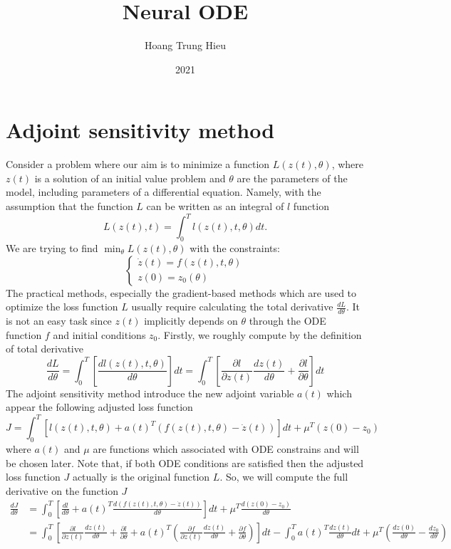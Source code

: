 \documentclass{article}
\theoremstyle{theorem}
\theoremstyle{definition}
\begin{document}
	
	
	\title{Neural ODE}
	
	\author{Hoang Trung Hieu
	}                      
	\date{2021}
	
	\noindent  
	\section{Adjoint sensitivity method}
	Consider a problem where our aim is to minimize a function $L(z(t), \theta)$, where $z(t)$ is a solution of an initial value problem and $\theta$ are the parameters of the model, including parameters of a differential equation. Namely, with the assumption that the function $L$ can be written as an integral of $l$ function $$L(z(t),t)= \int _{0}^{T} l(z(t),t,\theta)dt.$$ We are trying to find $\min_{\theta} L(z(t),\theta)$ with the constraints: $$\left\{\begin{matrix}
	\dot{z}(t)=f(z(t),t, \theta)	\\ 
	z(0)=z_0(\theta)
	\end{matrix}\right.$$
The practical methods, especially the gradient-based methods which are used to optimize the loss function $L$ usually require calculating the total derivative $\frac{dL}{d\theta}$. It is not an easy task since $z(t)$ implicitly depends on $\theta$ through the ODE function $f$ and initial conditions $z_0$. Firstly, we roughly compute by the definition of total derivative $$\frac{dL}{d\theta}= \int_{0}^{T} \left[\frac{dl(z(t),t,\theta)}{d\theta}\right]dt=\int_{0}^{T} \left[\frac{\partial l}{\partial z(t)} \frac{dz(t)}{d \theta} + \frac{\partial l}{ \partial \theta}\right]dt$$
The adjoint sensitivity method introduce the new adjoint variable $a(t)$ which appear the following adjusted loss function
$$J=\int _{0}^{T} \left[l(z(t),t,\theta)+a(t)^T (f(z(t),t, \theta) -\dot{z}(t) )\right]dt +\mu^{T}(z(0)-z_0)$$ where $a(t)$ and $\mu$ are functions which associated with ODE constrains and will be chosen later. Note that, if both ODE conditions are satisfied then the adjusted loss function $J$ actually is the original function $L$. So, we will compute the full derivative on the function $J$ 
$$\begin{aligned}	
\frac{dJ}{d\theta}&= \int_{0}^{T} \left[\frac{dl}{d\theta} +a(t)^T\frac{d(f(z(t),t, \theta) -\dot{z}(t) )}{d\theta}  \right]dt + \mu^T \frac{d(z(0)-z_0)}{d\theta} \\&=\int_{0}^{T} \left[\frac{\partial l}{\partial z(t)} \frac{dz(t)}{d \theta} + \frac{\partial l}{ \partial \theta} +a(t)^T \left(\frac{\partial f}{\partial z(t)} \frac{dz(t)}{d \theta} + \frac{\partial f}{ \partial \theta}\right)\right]dt -\int_{0}^{T} a(t)^T\frac{d \dot{z}(t)}{d\theta}dt+\mu^T \left( \frac{dz(0)}{d\theta} -\frac{dz_0}{d\theta} \right)  \end{aligned} $$
\end{document}
